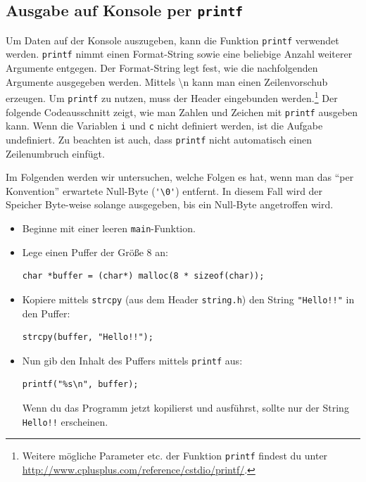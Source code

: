 \subsection{Ausgabe auf Konsole per \lstinline{printf}}

Um Daten auf der Konsole auszugeben, kann die Funktion \lstinline{printf} verwendet werden.
\lstinline{printf} nimmt einen Format-String sowie eine beliebige Anzahl weiterer Argumente entgegen.
Der Format-String legt fest, wie die nachfolgenden Argumente ausgegeben werden.
Mittels \textbackslash n kann man einen Zeilenvorschub erzeugen. Um \lstinline{printf} zu nutzen, muss der Header  eingebunden werden.\footnote{Weitere mögliche Parameter etc. der Funktion \lstinline{printf} findest du unter \url{http://www.cplusplus.com/reference/cstdio/printf/}.}
Der folgende Codeausschnitt zeigt, wie man Zahlen und Zeichen mit \lstinline|printf| ausgeben kann.
Wenn die Variablen \lstinline|i| und \lstinline|c| nicht definiert werden, ist die Aufgabe undefiniert.
Zu beachten ist auch, dass \lstinline|printf| nicht automatisch einen Zeilenumbruch einfügt.
%

Im Folgenden werden wir untersuchen, welche Folgen es hat, wenn man das \enquote{per Konvention} erwartete Null-Byte (\lstinline|'\0'|) entfernt.
In diesem Fall wird der Speicher Byte-weise solange ausgegeben, bis ein Null-Byte angetroffen wird.
\begin{itemize}
\item 
Beginne mit einer leeren \lstinline|main|-Funktion.
\item 
Lege einen Puffer der Größe 8 an:
\begin{lstlisting}
char *buffer = (char*) malloc(8 * sizeof(char));
\end{lstlisting}
\item 
Kopiere mittels \lstinline|strcpy| (aus dem Header \lstinline|string.h|) den String \lstinline|"Hello!!"| in den Puffer:
\begin{lstlisting}
strcpy(buffer, "Hello!!");
\end{lstlisting}
\item 
Nun gib den Inhalt des Puffers mittels \lstinline|printf| aus:
\begin{lstlisting}
printf("%s\n", buffer);
\end{lstlisting}
Wenn du das Programm jetzt kopilierst und ausführst, sollte nur der String \lstinline|Hello!!| erscheinen.
\end{itemize}

